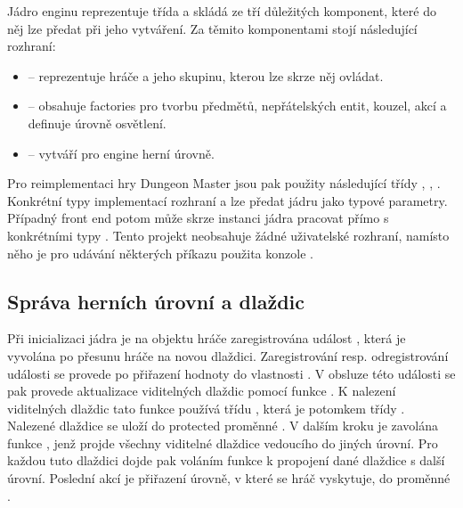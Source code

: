 Jádro enginu reprezentuje třída  a skládá ze tří důležitých komponent, které do něj lze předat při jeho vytváření. 
Za těmito komponentami stojí následující rozhraní:

\begin{itemize}
\item {} -- reprezentuje hráče a jeho skupinu, kterou lze skrze něj ovládat.
\item {} -- obsahuje factories pro tvorbu předmětů, nepřátelských entit, kouzel, akcí a definuje úrovně osvětlení.
\item {} -- vytváří pro engine herní úrovně.
\end{itemize}

Pro reimplementaci hry Dungeon Master jsou pak použity následující třídy ,
, . Konkrétní typy implementací rozhraní
 a  lze předat jádru jako typové parametry.
Případný front end potom může skrze instanci jádra pracovat přímo s konkrétními typy . Tento projekt
neobsahuje žádné uživatelské rozhraní, namísto něho je pro udávání některých příkazu použita konzole .


\subsection{Správa herních úrovní a dlaždic}\label{engine-level-management}
Při inicializaci jádra je na objektu hráče zaregistrována událost , která
je vyvolána po přesunu hráče na novou dlaždici. Zaregistrování resp. odregistrování události se provede po
přiřazení hodnoty do vlastnosti . V obsluze této události se pak provede aktualizace
viditelných dlaždic pomocí funkce  . K nalezení viditelných dlaždic tato funkce používá
třídu , která je potomkem třídy . Nalezené dlaždice se
uloží do protected proměnné . V dalším kroku je zavolána funkce 
, jenž projde všechny viditelné dlaždice vedoucího do jiných úrovní. Pro
každou tuto dlaždici dojde pak voláním funkce  k propojení dané dlaždice s další
úrovní. Poslední akcí je přiřazení úrovně, v které se hráč vyskytuje, do proměnné .

